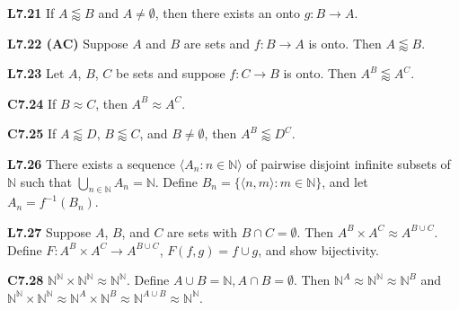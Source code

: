 \documentclass[10pt, landscape]{article}
\begin{document}
\begin{multicols*}{3}

\textbf{L7.21} If $A \lessapprox B$ and $A \neq \emptyset$, then there exists an onto $g:B\rightarrow A$.

\textbf{L7.22 (AC)} Suppose $A$ and $B$ are sets and $f: B \rightarrow A$ is onto. Then $A \lessapprox B$.

\textbf{L7.23} Let $A$, $B$, $C$ be sets and suppose $f:C\rightarrow B$ is onto. Then $A^B \lessapprox A^C$.

\textbf{C7.24} If $B \approx C$, then $A^B \approx A^C$.

\textbf{C7.25} If $A \lessapprox D$, $B \lessapprox C$, and $B \neq \emptyset$, then $A^B \lessapprox D^C$.

\textbf{L7.26} There exists a sequence $\langle A_n: n \in \mathbb{N} \rangle$ of pairwise disjoint infinite subsets of $\mathbb{N}$ such that $\bigcup_{n\in \mathbb{N}}A_n=\mathbb{N}$. Define $B_n=\{\langle n, m \rangle:m \in \mathbb{N}\}$, and let $A_n=f^{-1}(B_n)$.

\textbf{L7.27} Suppose $A$, $B$, and $C$ are sets with $B \cap C = \emptyset$. Then $A^B \times A^C \approx A^{B \cup C}$. Define $F:A^B\times A^C \rightarrow A^{B \cup C}$, $F(f, g) = f \cup g$, and show bijectivity.

\textbf{C7.28} $\mathbb{N}^\mathbb{N} \times \mathbb{N}^\mathbb{N} \approx \mathbb{N}^\mathbb{N}$. Define $A \cup B = \mathbb{N}, A \cap B = \emptyset$. Then $\mathbb{N}^A\approx \mathbb{N}^\mathbb{N} \approx \mathbb{N}^B$ and $\mathbb{N}^\mathbb{N}\times\mathbb{N}^\mathbb{N}\approx \mathbb{N}^A\times\mathbb{N}^B\approx \mathbb{N}^{A \cup B}\approx \mathbb{N}^\mathbb{N}$.


\end{multicols*}
\end{document}
